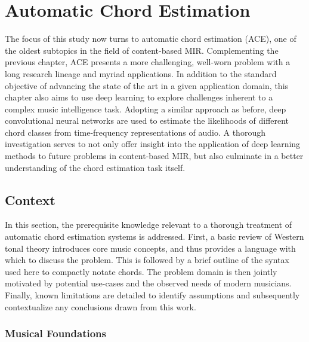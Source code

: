 \graphicspath{{5/figures/}}

\chapter{Automatic Chord Estimation}
\label{chp:chord_estimation}

The focus of this study now turns to automatic chord estimation (ACE), one of the oldest subtopics in the field of content-based MIR.
Complementing the previous chapter, ACE presents a more challenging, well-worn problem with a long research lineage and myriad applications.
In addition to the standard objective of advancing the state of the art in a given application domain, this chapter also aims to use deep learning to explore challenges inherent to a complex music intelligence task.
Adopting a similar approach as before, deep convolutional neural networks are used to estimate the likelihoods of different chord classes from time-frequency representations of audio.
A thorough investigation serves to not only offer insight into the application of deep learning methods to future problems in content-based MIR, but also culminate in a better understanding of the chord estimation task itself.

\section{Context}
\label{sec:context}

In this section, the prerequisite knowledge relevant to a thorough treatment of automatic chord estimation systems is addressed.
First, a basic review of Western tonal theory introduces core music concepts, and thus provides a language with which to discuss the problem.
This is followed by a brief outline of the syntax used here to compactly notate chords.
The problem domain is then jointly motivated by potential use-cases and the observed needs of modern musicians.
Finally, known limitations are detailed to identify assumptions and subsequently contextualize any conclusions drawn from this work.



\subsection{Musical Foundations}
\label{subsec:musical_foundations}

